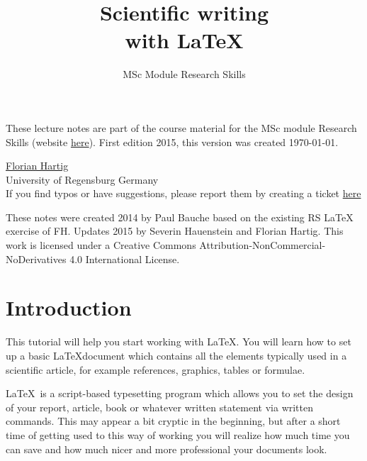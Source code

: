\documentclass[]{tufte-book} %
\title{Scientific writing\\with LaTeX}
\author{MSc Module Research Skills}
\begin{document}
\let\cleardoublepage\clearpage
\maketitle

\thispagestyle{empty}
\null


\begin{fullwidth}
These lecture notes are part of the course material for the MSc module Research Skills (website \href{http://florianhartig.github.io/ResearchSkills/}{here}). First edition 2015, this version was created \today.\\[0.5cm]
\end{fullwidth}

\begin{fullwidth}
\href{http://www.uni-regensburg.de/biologie-vorklinische-medizin/theoretische-oekologie/mitarbeiter/hartig/index.html}{Florian Hartig}\\
University of Regensburg
Germany\\[0.2cm]
If you find typos or have suggestions, please report them by creating a ticket \href{https://github.com/florianhartig/ResearchSkills/issues}{here}

\end{fullwidth}


\vfill
\begin{fullwidth}
These notes were created 2014 by Paul Bauche based on the existing RS LaTeX exercise of FH. Updates 2015 by Severin Hauenstein and Florian Hartig. This work is licensed under a Creative Commons Attribution-NonCommercial-NoDerivatives 4.0 International License.
\end{fullwidth}

\tableofcontents

\chapter{Introduction}

This tutorial will help you start working with \LaTeX. You will learn how to set up a basic  \LaTeX document which contains all the elements typically used in a scientific article, for example references, graphics, tables or formulae. 

 \LaTeX\ is a script-based typesetting program which allows you to set the design of your report, article, book or whatever written statement via written commands. This may appear a bit cryptic in the beginning, but after a short time of getting used to this way of working you will realize how much time you can save and how much nicer and more professional your documents look.
\end{document}
